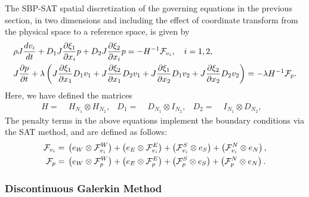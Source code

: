 The SBP-SAT spatial discretization of the governing equations in the previous section,
in two dimensions and including the effect of coordinate transform from the physical
space to a reference space, is given by
\begin{align}
  &\rho J \frac{d v_{i}}{dt}
	+ D_{1} J \frac{ \partial \xi_{1}}{\partial x_{i}} p
  + D_{2} J\frac{\partial \xi_{2}}{\partial x_{i}} p =
  - {H}^{-1}\mathcal{F}_{v_{i}}, \quad i=1,2,\\
  &J\frac{\partial p}{\partial t} +\lambda\left(
    J\frac{\partial \xi_{1}}{\partial x_{1}} D_{1} v_{1}
  + J\frac{\partial \xi_{2}}{\partial x_{1}} D_{2} v_{1}
  + J\frac{\partial \xi_{1}}{\partial x_{2}} D_{1} v_{2}
  + J\frac{\partial \xi_{2}}{\partial x_{2}} D_{2} v_{2}
  \right)
  =
  -\lambda H^{-1} \mathcal{F}_{p}.
\end{align}
Here, we have defined the matrices
\begin{align}
  H     =\;& H_{N_{1}}\otimes H_{N_{2}},&
  D_{1} =\;& D_{N_{1}}\otimes I_{N_{2}},&
  D_{2} =\;& I_{N_{1}}\otimes D_{N_{2}},&
\end{align}
The penalty terms in the above equations implement the boundary conditions via the
SAT method, and are defined as follows:
\begin{align}
  \mathcal{F}_{v_{i}} =\;&
    \left(  e_{W} \otimes \mathcal{F}^{W}_{v_{i}} \right)
  + \left(  e_{E} \otimes \mathcal{F}^{E}_{v_{i}} \right)
  + \left( \mathcal{F}^{S}_{v_{i}} \otimes e_{S} \right)
  + \left( \mathcal{F}^{N}_{v_{i}} \otimes e_{N} \right),\\
  \mathcal{F}_{p} =\;&
    \left( e_{W} \otimes \mathcal{F}^{W}_{p} \right)
  + \left( e_{E} \otimes \mathcal{F}^{E}_{p} \right)
  + \left( \mathcal{F}^{S}_{p} \otimes e_{S} \right)
  + \left( \mathcal{F}^{N}_{p} \otimes e_{N} \right).
\end{align}

\subsubsection{Discontinuous Galerkin Method}

